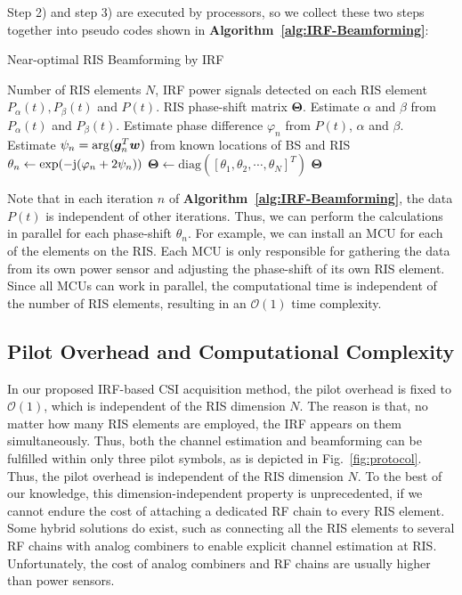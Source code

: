 \documentclass[journal,twocolumn]{IEEEtran}
\theoremstyle{nonumberplain}
\def \diag {\text{diag}}
\def \exp {\text{exp}}
\begin{document}
    Step 2) and step 3) are executed by processors, so we collect these two steps together into pseudo codes shown in {\bf Algorithm~\ref{alg:IRF-Beamforming}}:
    \begin{algorithm}[t] 
        \caption{Near-optimal RIS Beamforming by IRF} \label{alg:IRF-Beamforming}
        \begin{algorithmic}[1]
            \REQUIRE Number of RIS elements $N$, IRF power signals detected on each RIS element $P_{\alpha}(t), P_{\beta}(t)$ and $P(t)$.
            \ENSURE RIS phase-shift matrix ${\bm \Theta}$.
                \STATE Estimate $\alpha$ and $\beta$ from $P_{\alpha}(t)$ and $P_{\beta}(t)$.
                \STATE Estimate phase difference $\varphi_n$ from $P(t)$, $\alpha$ and $\beta$. 
                \STATE Estimate $\psi_{n} = {\rm arg}(\bm g_{n}^{T}\bm w)$ from known locations of BS and RIS
                \STATE $\theta_n \leftarrow \exp(-{\rm j}(\varphi_n + 2\psi_n))$
            \ENDFOR
            \STATE ${\bm \Theta} \leftarrow \diag\left(\left[\theta_1, \theta_2, \cdots, \theta_N\right]^{T}\right)$
            \RETURN ${\bm \Theta}$
        \end{algorithmic}
    \end{algorithm}
    Note that in each iteration $n$ of {\bf Algorithm~\ref{alg:IRF-Beamforming}}, the data $P(t)$ is independent of other iterations. Thus, we can perform the calculations in parallel for each phase-shift $\theta_n$. For example, we can install an MCU for each of the elements on the RIS. Each MCU is only responsible for gathering the data from its own power sensor and adjusting the phase-shift of its own RIS element. Since all MCUs can work in parallel, the computational time is independent of the number of RIS elements, resulting in an $\mathcal{O}(1)$ time complexity. 


\subsection{Pilot Overhead and Computational Complexity}\label{Pilot Overhead}
    In our proposed IRF-based CSI acquisition method, the pilot overhead is fixed to $\mathcal{O}(1)$, which is independent of the RIS dimension $N$. 
    The reason is that, no matter how many RIS elements are employed, the IRF appears on them simultaneously. 
    Thus, both the channel estimation and beamforming can be fulfilled within only three pilot symbols, as is depicted in Fig.~\ref{fig:protocol}. 
    Thus, the pilot overhead is independent of the RIS dimension $N$. 
    To the best of our knowledge, this dimension-independent property is unprecedented, if we cannot endure the cost of attaching a dedicated RF chain to every RIS element. Some hybrid solutions do exist, such as connecting all the RIS elements to several RF chains with analog combiners\cite{alexandropoulos2021hybrid,alexandropoulos2020hardware} to enable explicit channel estimation at RIS. Unfortunately, the cost of analog combiners and RF chains are usually higher than power sensors.
    
\end{document}
